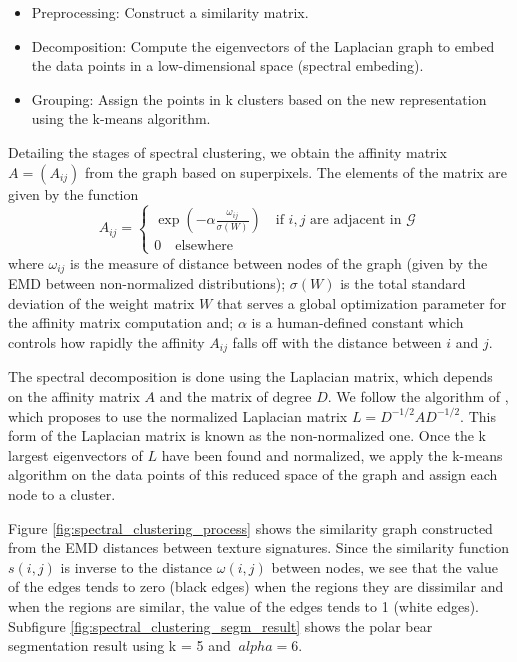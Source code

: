 \begin{itemize}
	\item Preprocessing: Construct a similarity matrix.
	\item Decomposition: Compute the eigenvectors of the Laplacian graph to embed the data points in a low-dimensional space (spectral embeding).
	\item Grouping: Assign the points in k clusters based on the new representation using the k-means algorithm.
\end{itemize}

Detailing the stages of spectral clustering, we obtain the affinity matrix $A = (A_{ij})$ from the graph based on superpixels. The elements of the matrix are given by the function
\begin{equation}	
	A_{ij}= 
	\begin{cases}
		\exp{\left(- \alpha \frac{\omega_{ij}}{\sigma(W)}\right)}  \quad \text{if $i, j$ are adjacent in $\mathcal{G}$} \\
		0 \quad \text{elsewhere}
	\end{cases}	 
\end{equation}
where $\omega_{ij}$ is the measure of distance between nodes of the graph (given by the EMD between non-normalized distributions); $\sigma(W)$ is the total standard deviation of the weight matrix $W$ that serves a global optimization parameter for the affinity matrix computation and; $\alpha$ is a human-defined constant which controls how rapidly the affinity $A_{ij}$ falls off with the distance between $i$ and $j$.

The spectral decomposition is done using the Laplacian matrix, which depends on the affinity matrix $A$ and the matrix of degree $D$. We follow the algorithm of \cite{Ng.Jordan.ea:NIPS:2001}, which proposes to use the normalized Laplacian matrix $L = D^{-1/2} A D^{-1/2}$. This form of the Laplacian matrix is known as the non-normalized one. Once the k largest eigenvectors of $ L $ have been found and normalized, we apply the k-means algorithm on the data points of this reduced space of the graph and assign each node to a cluster.

Figure \ref{fig:spectral_clustering_process} shows the similarity graph constructed from the EMD distances between texture signatures. Since the similarity function $s(i, j)$ is inverse to the distance $\omega (i, j)$ between nodes, we see that the value of the edges tends to zero (black edges) when the regions they are dissimilar and when the regions are similar, the value of the edges tends to 1 (white edges). Subfigure \ref{fig:spectral_clustering_segm_result} shows the polar bear segmentation result using k = 5 and $ \ alpha = 6 $.

